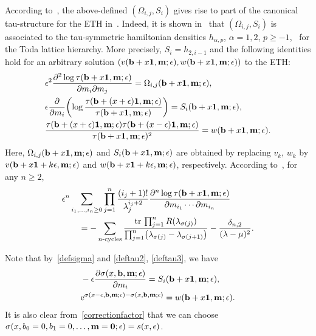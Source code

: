 \documentclass[11pt]{article}
\numberwithin{equation}{section}
\newcommand{\e}{\epsilon}
\newcommand{\p}{\partial}
\newcommand{\tr}{{\rm tr}}
\newcommand{\nn}{\nonumber}
\numberwithin{equation}{section}
\begin{document}
According to~\cite{DY}, the above-defined $(\Omega_{i,j}, S_i)$ gives rise to part of
the canonical tau-structure for the ETH in~\cite{CDZ, DZ-toda}.
Indeed, it is shown in~\cite{DY} that $(\Omega_{i,j}, S_i)$ is associated to the
tau-symmetric hamiltonian densities $h_{\alpha,p}$, $\alpha=1,2$, $p\ge-1$,~\cite{CDZ, DZ-toda} for the Toda lattice hierarchy.
More precisely, $S_i=h_{2,i-1}$ and the following identities hold
for an arbitrary solution $(v({\bf b}+x{\bf 1},{\bf m};\e), w({\bf b}+x{\bf 1},{\bf m};\e))$ to the ETH:
\begin{align}
& \e^2\frac{\p^2 \log\tau({\bf b}+x{\bf 1},{\bf m};\e)}{\p m_i \p m_j}=\Omega_{i,j}({\bf b}+x{\bf 1},{\bf m};\e),\nn \\%
& \e \frac{\p}{\p m_i} \biggl(\log \frac{\tau({\bf b}+(x+\e){\bf 1},{\bf m};\e)}{\tau({\bf b}+x{\bf 1},{\bf m};\e)}\biggr) =
S_i({\bf b}+x{\bf 1},{\bf m};\e), \label{deftau2} \\
& \frac{\tau({\bf b}+(x+\e){\bf 1},{\bf m};\e)\tau({\bf b}+(x-\e){\bf 1},{\bf m};\e)}{\tau({\bf b}+x{\bf 1},{\bf m};\e)^2} = w({\bf b}+x{\bf 1},{\bf m};\e). \label{deftau3}
\end{align}
Here, $\Omega_{i,j}({\bf b}+x{\bf 1},{\bf m};\e)$ and
$S_i({\bf b}+x{\bf 1},{\bf m};\e)$ are obtained by replacing $v_k$, $w_k$ by $v({\bf b}+x{\bf 1}+k\e,{\bf m};\e)$ and
$w({\bf b}+x{\bf 1}+k\e,{\bf m};\e)$, respectively.
According to~\cite{DY}, for any $n\ge2$,
\begin{align}
&\e^n \sum_{i_1,\dots,i_n\ge0}
\prod_{j=1}^n \frac{(i_j+1)!}{\lambda_j^{i_j+2}} \frac{\p^n \log \tau({\bf b}+x{\bf 1},{\bf m}; \e)}{\p m_{i_1} \cdots \p m_{i_n}}\nn\\
&\qquad{}= - \sum_{\text{$n$-cycles}}
\frac{\tr \, \prod_{j=1}^n R(\lambda_{\sigma(j)})}{\prod_{j=1}^n \bigl(\lambda_{\sigma(j)}-\lambda_{\sigma(j+1)}\bigr)} - \frac{\delta_{n,2}}{(\lambda-\mu)^2}.\label{multiderivativesresolvent}
\end{align}

Note that by~\eqref{defsigma} and \eqref{deftau2}, \eqref{deftau3}, we have
\begin{align}
& - \e\frac{\p \sigma(x, {\bf b},{\bf m};\e)}{\p m_i} = S_i({\bf b}+x{\bf 1},{\bf m};\e), \label{property1sigma} \\
& {\rm e}^{\sigma(x-\e, {\bf b},{\bf m};\e)-\sigma(x, {\bf b},{\bf m};\e)} = w({\bf b}+x{\bf 1},{\bf m};\e). \label{propertysigma}
\end{align}
It is also clear from~\eqref{correctionfactor} that we can choose
$\sigma(x, b_0=0, b_1=0, \dots, {\bf m}={\bf 0};\e)=s(x,\e)$.
\end{document}
